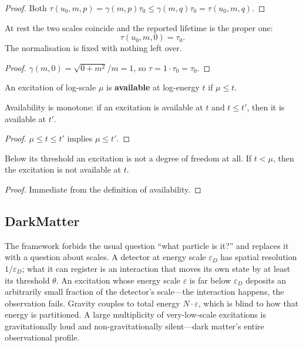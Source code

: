 \begin{proof}
Both $\tau(u_0, m, p) = \gamma(m, p) \tau_0 \leq \gamma(m, q) \tau_0 = \tau(u_0, m, q)$.
\end{proof}

\begin{theorem}
At rest the two scales coincide and the reported lifetime is the proper one:
\begin{equation}
\tau(u_0, m, 0) = \tau_0 .
\end{equation}
The normalisation is fixed with nothing left over.
\end{theorem}

\begin{proof}
$\gamma(m, 0) = \sqrt{0 + m^2}/m = 1$, so $\tau = 1 \cdot \tau_0 = \tau_0$.
\end{proof}

\begin{definition}
An excitation of log-scale $\mu$ is \textbf{available} at log-energy $t$ if $\mu \leq t$.
\end{definition}

\begin{theorem}
Availability is monotone: if an excitation is available at $t$ and $t \leq t'$, then it is available at $t'$.
\end{theorem}

\begin{proof}
$\mu \leq t \leq t'$ implies $\mu \leq t'$.
\end{proof}

\begin{theorem}
Below its threshold an excitation is not a degree of freedom at all. If $t < \mu$, then the excitation is not available at $t$.
\end{theorem}

\begin{proof}
Immediate from the definition of availability.
\end{proof}

\subsection{DarkMatter}

The framework forbids the usual question ``what particle is it?'' and replaces it with a question about scales. A detector at energy scale $\varepsilon_D$ has spatial resolution $1/\varepsilon_D$; what it can register is an interaction that moves its own state by at least its threshold $\theta$. An excitation whose energy scale $\varepsilon$ is far below $\varepsilon_D$ deposits an arbitrarily small fraction of the detector's scale—the interaction happens, the observation fails. Gravity couples to total energy $N \cdot \varepsilon$, which is blind to how that energy is partitioned. A large multiplicity of very-low-scale excitations is gravitationally loud and non-gravitationally silent—dark matter's entire observational profile.


